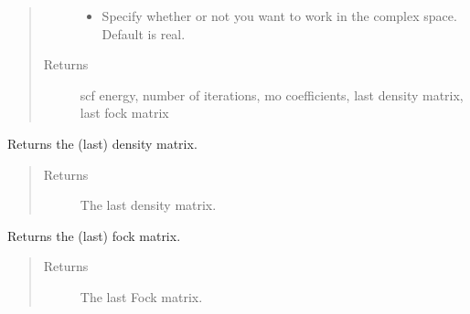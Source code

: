 \documentclass[letterpaper,10pt,english]{sphinxmanual}
\begin{document}
\begin{fulllineitems}
\begin{fulllineitems}
\begin{quote}
\begin{description}
\begin{itemize}
\item {} 
 \textendash{} Specify whether or not you want to work in the complex space. Default is real.

\end{itemize}

\item[{Returns}] \leavevmode
scf energy, number of iterations, mo coefficients, last density matrix, last fock matrix

\end{description}\end{quote}

\end{fulllineitems}


\begin{fulllineitems}
\label{\detokenize{RHF:hf.HartreeFock.RHF.MF.get_dens}}
Returns the (last) density matrix.
\begin{quote}\begin{description}
\item[{Returns}] \leavevmode
The last density matrix.

\end{description}\end{quote}

\end{fulllineitems}


\begin{fulllineitems}
\label{\detokenize{RHF:hf.HartreeFock.RHF.MF.get_fock}}
Returns the (last) fock matrix.
\begin{quote}\begin{description}
\item[{Returns}] \leavevmode
The last Fock matrix.

\end{description}\end{quote}

\end{fulllineitems}



\end{fulllineitems}
\end{document}
